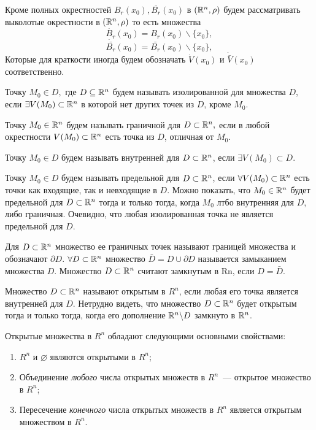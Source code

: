 \documentclass[../../main.tex]{subfiles}
\begin{document}
  \begin{rem}
    Кроме полных окрестностей $B_r(x_0), \overline{B_r}(x_0)$ в $
    (\mathbb{R}^n, \rho)$ будем рассматривать выколотые окрестности в $
    (\mathbb{R}^n, \rho)$ то есть множества
    \[
      \dot{B_r}(x_0) = B_r(x_0) \backslash \{x_0\},
    \]
    \[
      \dot{\bar{B_r}}(x_0) = \bar{B_r}(x_0) \backslash \{x_0\},
    \]
    Которые для краткости иногда будем обозначать $\dot{V}(x_0) $ и 
    $\dot{\bar{V}}(x_0)$ соответственно. 
  \end{rem}
  \smallskip
  
  Точку $M_0 \in D,$ где $D \subseteq \mathbb{R}^n$ будем называть 
  изолированной для множества $D$, если $\exists V(M_0) \subset 
  \mathbb{R}^n$ в которой нет других точек из $D$, кроме $M_0$.
  
  Точку $M_0 \in \mathbb{R}^n$ будем называть граничной для $D \subset \mathbb{R}^n,
  $ если в любой окрестности $V(M_0) \subset \mathbb{R}^n$ есть точка из 
  $D$, отличная от $M_0$. 
  
  Точку $M_0 \in D$ будем называть внутренней для $D \subset \mathbb{R}^n$, 
  если $\exists V(M_0) \subset D$.
  
  Точку $M_0 \in D$ будем называть предельной для $D \subset \mathbb{R}^n$, 
  если $\forall V(M_0) \subset \mathbb{R}^n$ есть точки как входящие, так и 
  невходящие в $D$.
  Можно показать, что $M_0 \in \mathbb{R}^n$ будет предельной для $D \subset 
  \mathbb{R}^n$ тогда и только тогда, когда $M_0$ лтбо внутренняя для $D$, 
  либо граничная.
  Очевидно, что любая изолированная точка не является предельной для 
  $D$.
  
  Для $D \subset \mathbb{R}^n$ множество ее граничных точек называют 
  границей множества  и обозначают $\partial D$. 
  $\forall D \subset \mathbb{R}^n$ множество $\bar D = D \cup \partial D$ 
  называется замыканием множества $D$. 
  Множество $D \subset \mathbb{R}^n$ считают замкнутым в Rn, если  $D = \bar 
  D$.
  
  Множество $D \subset \mathbb{R}^n$ называют открытым в $R^n$, если любая 
  его точка является внутренней для $D$. Нетрудно видеть, что 
  множество $D \subset \mathbb{R}^n$ будет открытым тогда и только тогда, 
  когда его дополнение $\mathbb{R}^n \backslash D$ замкнуто в $\mathbb{R}^n$. 
  
  \smallskip
  Открытые множества в $R^n$ обладают следующими основными 
  свойствами:
  \begin{enumerate}
    \item
     $R^n$  и $\varnothing$ являются открытыми в $R^n$; 
     \item
      Объединение \emph{любого} числа открытых множеств в $R^n$~--- 
      открытое множество в $R^n$; 
      \item Пересечение \emph{конечного} числа открытых множеств в 
      $R^n$ является открытым множеством в $R^n$.
  \end{enumerate}  
\end{document}

